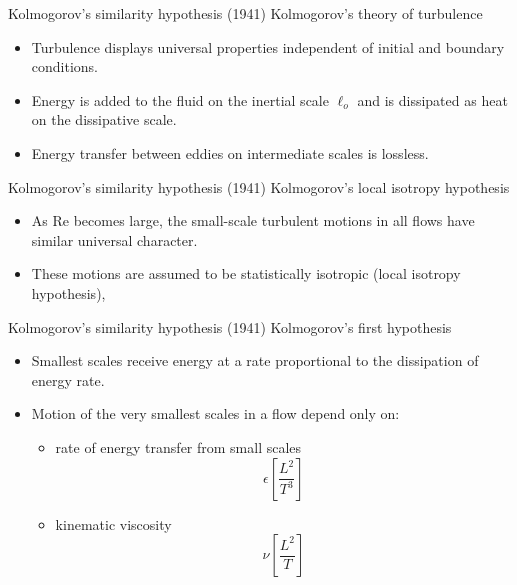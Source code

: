 
\begin{frame}{Kolmogorov's similarity hypothesis (1941)}
	Kolmogorov's theory of turbulence
	\begin{itemize}
		\item Turbulence displays universal properties independent of initial and boundary conditions.
		\item Energy is added to the fluid on the inertial scale $\ell_o$ and is dissipated as heat on the dissipative scale.
		\item Energy transfer between eddies on intermediate scales is lossless.
	\end{itemize}
\end{frame}


\begin{frame}{Kolmogorov's similarity hypothesis (1941)}
	Kolmogorov's local isotropy hypothesis
	\begin{itemize}
		\item As Re becomes large, the small-scale turbulent motions in all flows have similar universal character.
		\item These motions are assumed to be statistically isotropic (local isotropy hypothesis),
	\end{itemize}
\end{frame}


\begin{frame}{Kolmogorov's similarity hypothesis (1941)}
	Kolmogorov's first hypothesis
	\begin{itemize}
		\item Smallest scales receive energy at a rate proportional to the dissipation of energy rate.
		\item Motion of the very smallest scales in a flow depend only on:
		\begin{itemize}
			\item rate of energy transfer from small scales
			$$\epsilon \left[ \frac{L^2}{T^3}\right]$$
			\item kinematic viscosity
			$$\nu \left[\frac{L^2}{T} \right]$$
		\end{itemize}
	\end{itemize}
\end{frame}


